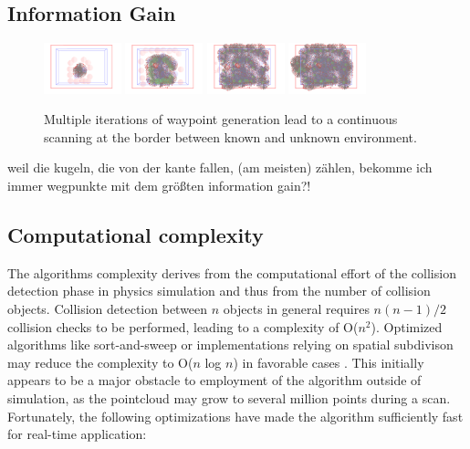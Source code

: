 \documentclass[a4paper, 10pt, conference]{ieeeconf}        %
\begin{document}



\subsection{Information Gain}

\begin{figure}[ht]
  \centering
    \includegraphics[width=0.2\textwidth]{images/process1}
    \includegraphics[width=0.2\textwidth]{images/process2}
    \includegraphics[width=0.2\textwidth]{images/process3}
    \includegraphics[width=0.2\textwidth]{images/process4}
    \caption{Multiple iterations of waypoint generation lead to a continuous scanning at the border between known and unknown environment.}
\end{figure}

weil die kugeln, die von der kante fallen, (am meisten) zählen, bekomme ich immer wegpunkte mit dem größten information gain?!

\subsection{Computational complexity}

The algorithms complexity derives from the computational effort of the collision detection phase in physics simulation and thus from the number of collision objects. Collision detection between $n$ objects in general requires $n(n-1)/2$ collision checks to be performed, leading to a complexity of O($n^2$). Optimized algorithms like sort-and-sweep or implementations relying on spatial subdivison may reduce the complexity to O($n$ log $n$) in favorable cases \cite{legrand2007}. This initially appears to be a major obstacle to employment of the algorithm outside of simulation, as the pointcloud may grow to several million points during a scan. Fortunately, the following optimizations have made the algorithm sufficiently fast for real-time application:
\end{document}
